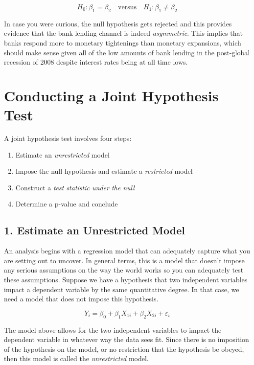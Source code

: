 \documentclass[
]{book}
\begin{document}
\[H_0: \beta_1=\beta_2 \quad \text{versus} \quad H_1: \beta_1 \neq \beta_2\]

In case you were curious, the null hypothesis gets rejected and this provides evidence that the bank lending channel is indeed \emph{asymmetric}. This implies that banks respond more to monetary tightenings than monetary expansions, which should make sense given all of the low amounts of bank lending in the post-global recession of 2008 despite interest rates being at all time lows.

\section{Conducting a Joint Hypothesis Test}\label{conducting-a-joint-hypothesis-test}

A joint hypothesis test involves four steps:

\begin{enumerate}
\def\labelenumi{\arabic{enumi}.}
\item
  Estimate an \emph{unrestricted} model
\item
  Impose the null hypothesis and estimate a \emph{restricted} model
\item
  Construct a \emph{test statistic under the null}
\item
  Determine a p-value and conclude
\end{enumerate}

\subsection*{1. Estimate an Unrestricted Model}\label{estimate-an-unrestricted-model}

An analysis begins with a regression model that can adequately capture what you are setting out to uncover. In general terms, this is a model that doesn't impose any serious assumptions on the way the world works so you can adequately test these assumptions. Suppose we have a hypothesis that two independent variables impact a dependent variable by the same quantitative degree. In that case, we need a model that does not impose this hypothesis.

\[Y_i = \beta_0 + \beta_1 X_{1i} + \beta_2 X_{2i} + \varepsilon_i\]

The model above allows for the two independent variables to impact the dependent variable in whatever way the data sees fit. Since there is no imposition of the hypothesis on the model, or no restriction that the hypothesis be obeyed, then this model is called the \emph{unrestricted} model.
\end{document}
